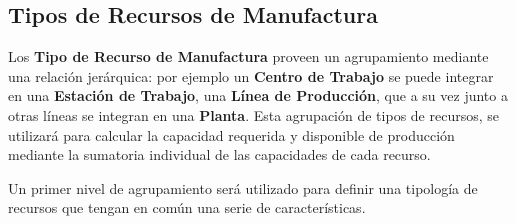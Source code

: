 \documentclass[letterpaper,10pt,spanish]{sphinxmanual}
\begin{document}
\subsection{Tipos de Recursos de Manufactura}
\label{manufactura-flujos:tipos-de-recursos-de-manufactura}
Los \textbf{Tipo de Recurso de Manufactura} proveen un agrupamiento mediante una relación jerárquica: por ejemplo un \textbf{Centro de Trabajo} se puede integrar en una \textbf{Estación de Trabajo}, una \textbf{Línea de Producción}, que a su vez junto a otras líneas se integran en una \textbf{Planta}. Esta agrupación de tipos de recursos, se utilizará para calcular la capacidad requerida y disponible de producción mediante la sumatoria individual de las capacidades de cada recurso.

Un primer nivel de agrupamiento será utilizado para definir una tipología de recursos que tengan en común una serie de características.
\end{document}
